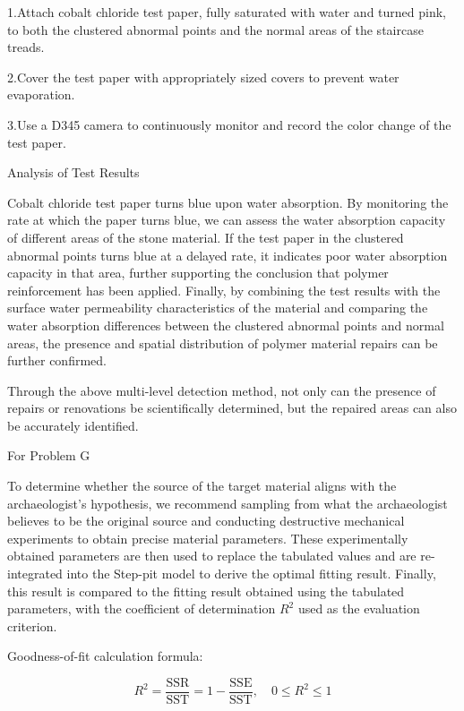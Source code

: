 \documentclass{mcmthesis}
\begin{document}
1.Attach cobalt chloride test paper, fully saturated with water and turned pink, to both the clustered abnormal points and the normal areas of the staircase treads.

2.Cover the test paper with appropriately sized covers to prevent water evaporation.

3.Use a D345 camera to continuously monitor and record the color change of the test paper.


Analysis of Test Results


Cobalt chloride test paper turns blue upon water absorption. By monitoring the rate at which the paper turns blue, we can assess the water absorption capacity of different areas of the stone material.
If the test paper in the clustered abnormal points turns blue at a delayed rate, it indicates poor water absorption capacity in that area, further supporting the conclusion that polymer reinforcement has been applied.
Finally, by combining the test results with the surface water permeability characteristics of the material and comparing the water absorption differences 
between the clustered abnormal points and normal areas, the presence and spatial distribution of polymer material repairs can be further confirmed.

Through the above multi-level detection method, not only can the presence of repairs or renovations be scientifically determined, but the repaired areas can also be accurately identified.

For Problem G

To determine whether the source of the target material aligns with the archaeologist's hypothesis, we recommend sampling from what the archaeologist believes to be the original source and conducting destructive mechanical experiments to obtain precise material parameters. These experimentally obtained parameters are then used to replace the tabulated values and are re-integrated into the Step-pit model to derive the optimal fitting result. Finally, this result is compared to the fitting result obtained using the tabulated parameters, with the coefficient of determination $R^2$ used as the evaluation criterion.


Goodness-of-fit calculation formula:


\[R^2 = \frac{\text{SSR}}{\text{SST}} = 1 - \frac{\text{SSE}}{\text{SST}}, \quad 0 \leq R^2 \leq 1 \]
\end{document}
